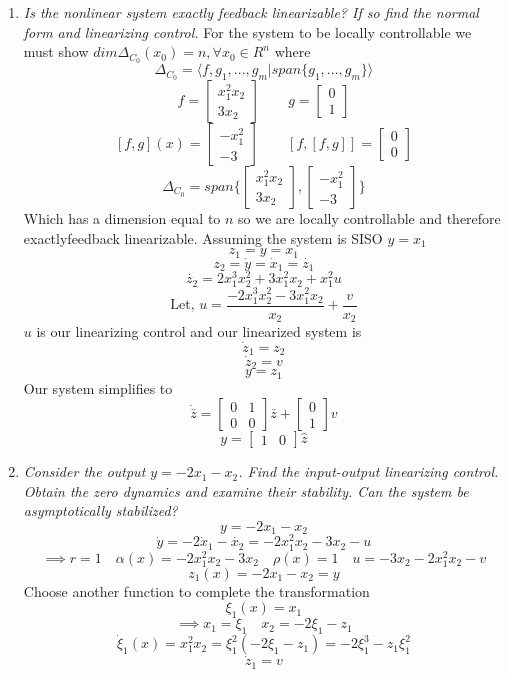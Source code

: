 \documentclass{article}
\begin{document}
\begin{enumerate}[(1)]
\item \emph{Is the nonlinear system exactly feedback linearizable? If so find the normal form and linearizing control.}
\newline
\newline
For the system to be locally controllable we must show $dim \Delta_{C_0}(x_0) = n, \forall x_0 \in R^n $ where
$$ \Delta_{C_0} =  \langle f,g_1,... ,g_m | span\{g_1, ... ,g_m\}\rangle $$
$$ f = \begin{bmatrix} x_1^2x_2 \\ 3x_2\end{bmatrix} \qquad g = \begin{bmatrix}0 \\ 1 \end{bmatrix} $$
$$ [f, g](x) = \begin{bmatrix} -x_1^2 \\ -3 \end{bmatrix} \qquad [f,[f,g]] = \begin{bmatrix} 0 \\ 0 \end{bmatrix}$$
$$ \Delta_{C_0} = span\{\begin{bmatrix} x_1^2x_2 \\ 3x_2\end{bmatrix}, \begin{bmatrix} -x_1^2 \\ -3 \end{bmatrix} \} $$
Which has a dimension equal to $n$ so we are locally controllable and therefore exactlyfeedback linearizable.
Assuming the system is SISO $y = x_1$
$$z_1 = y = x_1 $$
$$z_2 = \dot{y} = \dot{x}_1 = \dot{z_1} $$
$$ \dot{z_2} = 2x_1^3x_2^2 + 3x_1^2x_2 + x_1^2u $$
$$ \text{Let, } u = \frac{-2x_1^3x_2^2-3x_1^2x_2}{x_2} + \frac{v}{x_2} $$
$u$ is our linearizing control and our linearized system is
$$ \dot{z}_1 = z_2 $$
$$ \dot{z}_2 = v $$
$$ y =  z_1 $$
Our system simplifies to
$$
\dot{\bar{z}}=
\begin{bmatrix}
0 & 1 \\
0 & 0
\end{bmatrix}
\bar{z}
+
\begin{bmatrix}
0 \\
1
\end{bmatrix}
v
$$
$$ y = \begin{bmatrix} 1 & 0 \end{bmatrix} \hat{z} $$

\item \emph{Consider the output $y = -2x_1-x_2$. Find the input-output linearizing control.
            Obtain the zero dynamics and examine their stability.
            Can the system be asymptotically stabilized?}
\newline
\newline
$$ y = -2x_1-x_2$$
$$ \dot{y} = -2\dot{x}_1 - \dot{x_2} = -2x_1^2x_2 -3x_2 - u $$
$$ \implies r = 1 \quad \alpha(x) = -2x_1^2x_2-3x_2 \quad \rho(x)= 1 \quad u = -3x_2 - 2x_1^2x_2 - v$$
$$ z_1 (x) = -2x_1 -x_2 = y $$
Choose another function to complete the transformation
$$ \xi_1(x) = x_1 $$
$$ \implies x_1 = \xi_1 \quad x_2 = -2\xi_1-z_1 $$
$$ \dot{\xi}_1(x) = x_1^2x_2  = \xi_1^2(-2\xi_1-z_1) = -2\xi_1^3 -z_1\xi_1^2$$
$$ \dot{z}_1 = v $$


\end{enumerate}
\end{document}
